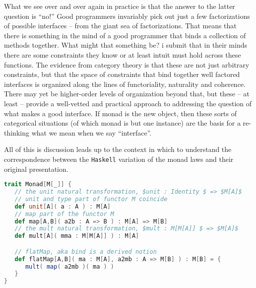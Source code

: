 What we see over and over again in practice is that the answer to
the latter question is ``no!'' Good programmers invariably pick out just a
few factorizations of possible interfaces -- from the giant sea of
factorizations. That means that there is something in the mind of a
good programmer that binds a collection of methods together. What
might that something be? i submit that in their minds there are some
constraints they know or at least intuit must hold across these
functions. The evidence from category theory is that these are not
just arbitrary constraints, but that the space of constraints that
bind together well factored interfaces is organized along the lines of
functoriality, naturality and coherence. There may yet be higher-order
levels of organization beyond that, but these -- at least -- provide a
well-vetted and practical approach to addressing the question of what
makes a good interface. If monad is the new object, then these sorts
of categorical situations (of which monad is but one instance) are the
basis for a re-thinking what we mean when we say ``interface''.

All of this is discussion leads up to the context in which to
understand the correspondence between the \texttt{Haskell} variation
of the monad laws and their original presentation. 

\break
\begin{lstlisting}[language=Scala,mathescape=true,frame=single,caption={categorical presentation of monad as Scala trait},captionpos=b]
trait Monad[M[_]] {
   // the unit natural transformation, $unit : Identity $ => $M[A]$
   // unit and type part of functor M coincide
   def unit[A]( a : A ) : M[A]
   // map part of the functor M
   def map[A,B]( a2b : A => B ) : M[A] => M[B]
   // the mult natural transformation, $mult : M[M[A]] $ => $M[A]$   
   def mult[A]( mma : M[M[A]] ) : M[A]

   // flatMap, aka bind is a derived notion
   def flatMap[A,B]( ma : M[A], a2mb : A => M[B] ) : M[B] = {
      mult( map( a2mb )( ma ) )
   }
}
\end{lstlisting}








